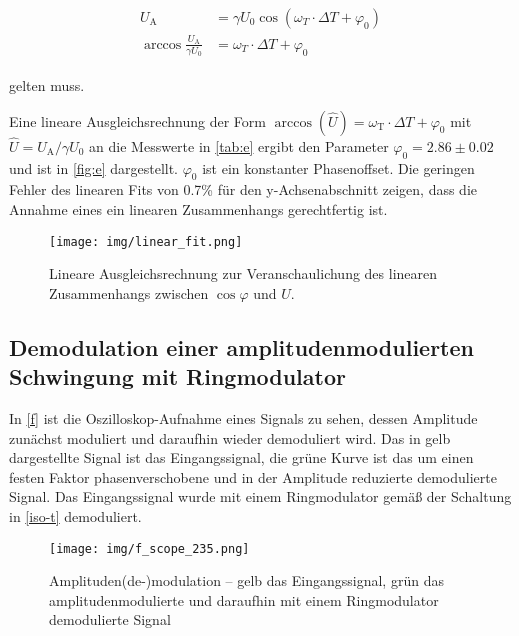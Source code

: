 \begin{align}
\begin{split}
	U_\text{A} &= \gamma U_0 \cos(\omega_T \cdot \Delta T + \varphi_0)\\
	\arccos \frac{U_\text{A}}{\gamma U_0} &= \omega_T \cdot \Delta T + \varphi_0
\end{split}
\end{align}

gelten muss.\par

Eine lineare Ausgleichsrechnung der Form $\arccos (\hat{U}) = \omega_\text{T} \cdot \Delta T + \varphi_0$ mit $\hat{U} = U_\text{A}/\gamma U_0$ an die Messwerte in \autoref{tab:e} ergibt den Parameter $\varphi_0 = 2.86 \pm 0.02$ und ist in \autoref{fig:e} dargestellt. $\varphi_0$ ist ein konstanter Phasenoffset. Die geringen Fehler des linearen Fits von 0.7\% für den y-Achsenabschnitt zeigen, dass die Annahme eines ein linearen Zusammenhangs gerechtfertig ist.

\begin{figure}[h!]
	\centering
	\texttt{[image: img/linear\_fit.png]}
	\caption{Lineare Ausgleichsrechnung zur Veranschaulichung des linearen Zusammenhangs zwischen $\cos\varphi$ und $U$.}
	\label{fig:e}
\end{figure}

\FloatBarrier

\newpage

\subsection{Demodulation einer amplitudenmodulierten Schwingung mit Ringmodulator}

In \autoref{f} ist die Oszilloskop-Aufnahme eines Signals zu sehen, dessen Amplitude zunächst moduliert und daraufhin wieder demoduliert wird. Das in gelb dargestellte Signal ist das Eingangssignal, die grüne Kurve ist das um einen festen Faktor phasenverschobene und in der Amplitude reduzierte demodulierte Signal. Das Eingangssignal wurde mit einem Ringmodulator gemäß der Schaltung in \autoref{iso-t} demoduliert.

\begin{figure}[h!]
	\centering
	\texttt{[image: img/f\_scope\_235.png]}
	\caption{Amplituden(de-)modulation -- gelb das Eingangssignal, grün das amplitudenmodulierte und daraufhin mit einem Ringmodulator demodulierte Signal}
	\label{f}
\end{figure}

